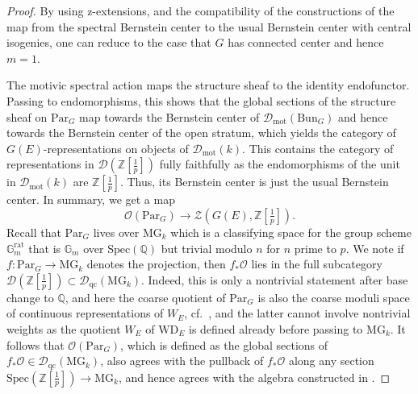 \documentclass[11pt]{amsart}
\numberwithin{equation}{section}
\numberwithin{theorem}{section}
\theoremstyle{definition}
\begin{document}
\begin{proof} By using z-extensions, and the compatibility of the constructions of the map from the spectral Bernstein center to the usual Bernstein center with central isogenies, one can reduce to the case that $G$ has connected center and hence $m=1$.

The motivic spectral action maps the structure sheaf to the identity endofunctor. Passing to endomorphisms, this shows that the global sections of the structure sheaf on $\mathrm{Par}_G$ map towards the Bernstein center of $\mathcal D_{\mathrm{mot}}(\mathrm{Bun}_G)$ and hence towards the Bernstein center of the open stratum, which yields the category of $G(E)$-representations on objects of $\mathcal D_{\mathrm{mot}}(k)$. This contains the category of representations in $\mathcal D(\mathbb Z[\tfrac 1p])$ fully faithfully as the endomorphisms of the unit in $\mathcal D_{\mathrm{mot}}(k)$ are $\mathbb Z[\tfrac 1p]$. Thus, its Bernstein center is just the usual Bernstein center. In summary, we get a map
\[
\mathcal O(\mathrm{Par}_G)\to \mathcal{Z}(G(E),\mathbb Z[\tfrac 1p]).
\]
Recall that $\mathrm{Par}_G$ lives over $\mathrm{MG}_k$ which is a classifying space for the group scheme $\mathbb G_m^{\mathrm{rat}}$ that is $\mathbb G_m$ over $\mathrm{Spec}(\mathbb Q)$ but trivial modulo $n$ for $n$ prime to $p$. We note if $f: \mathrm{Par}_G\to \mathrm{MG}_k$ denotes the projection, then $f_\ast \mathcal O$ lies in the full subcategory $\mathcal D(\mathbb Z[\tfrac 1p])\subset \mathcal D_{\mathrm{qc}}(\mathrm{MG}_k)$. Indeed, this is only a nontrivial statement after base change to $\mathbb Q$, and here the coarse quotient of $\mathrm{Par}_G$ is also the coarse moduli space of continuous representations of $W_E$, cf.~\cite[Proposition 4.17 (ii)]{DHKM}, and the latter cannot involve nontrivial weights as the quotient $W_E$ of $\mathrm{WD}_E$ is defined already before passing to $\mathrm{MG}_k$. It follows that $\mathcal O(\mathrm{Par}_G)$, which is defined as the global sections of $f_\ast \mathcal O\in \mathcal D_{\mathrm{qc}}(\mathrm{MG}_k)$, also agrees with the pullback of $f_\ast \mathcal O$ along any section $\mathrm{Spec}(\mathbb Z[\tfrac 1p])\to \mathrm{MG}_k$, and hence agrees with the algebra constructed in \cite[Theorem 4.18]{DHKM}.


\end{proof}
\end{document}
